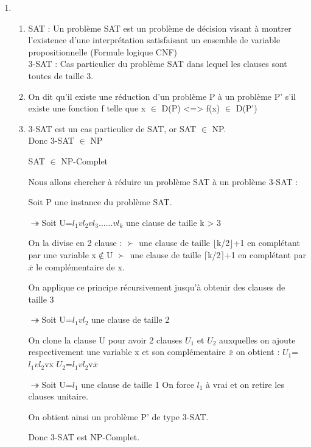 \documentclass{article}
\begin{document}
\begin{enumerate}
\begin{enumerate}
\item 
  \begin{enumerate}
  \item
    SAT : Un  problème SAT est un problème de décision visant à montrer l'existence d'une interprétation satisfaisant un ensemble de variable propositionnelle (Formule logique CNF)\\
    3-SAT : Cas particulier du problème SAT dans lequel les clauses sont toutes de taille 3.\\

  \item
    On dit qu'il existe une réduction d'un problème P à un problème P' s'il existe une fonction f telle que x $\in$ D(P) <=> f(x) $\in$ D(P')\\

  \item
    3-SAT est un cas particulier de SAT, or SAT $\in$ NP.\\
    Donc 3-SAT $\in$ NP

    SAT $\in$ NP-Complet

    Nous allons chercher à réduire un problème SAT à un problème 3-SAT : 

    Soit P une instance du problème SAT.
    
    $\twoheadrightarrow$Soit U={$l_1vl_2vl_3......vl_k$} une clause de taille k > 3

    On la divise en 2 clause :
    $\succ$ une clause de taille $\lfloor$k/2$\rfloor$+1 en complétant par une variable x$\notin$U 
    $\succ$ une clause de taille $\lceil$k/2$\rceil$+1 en complétant par $\overline x$ le complémentaire de x.

    On applique ce principe récursivement jusqu'à obtenir des clauses de taille 3

    $\twoheadrightarrow$Soit U={$l_1vl_2$} une clause de taille 2
    
    On clone la clause U pour avoir 2 clauses $U_1$ et $U_2$ auxquelles on ajoute respectivement une variable x et son complémentaire $\overline x$
    on obtient :  $U_1$={$l_1vl_2$vx}
    $U_2$={$l_1vl_2$v$\overline x$}

    $\twoheadrightarrow$Soit U={$l_1$} une clause de taille 1
    On force $l_1$ à vrai et on retire les clauses unitaire.

    On obtient ainsi un problème P' de type 3-SAT.    

    Donc 3-SAT est NP-Complet.\\


\end{enumerate}
\end{enumerate}
\end{enumerate}
\end{document}
